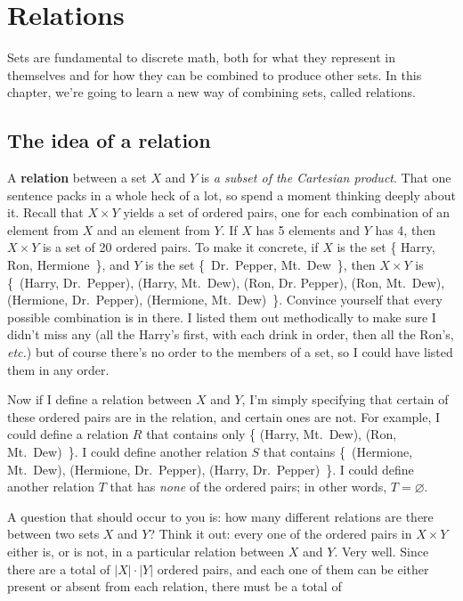
\chapter{Relations}
\label{chap:relations}

Sets are fundamental to discrete math, both for what they represent in
themselves and for how they can be combined to produce other sets. In this
chapter, we're going to learn a new way of combining sets, called
relations.

\section{The idea of a relation}

A \textbf{relation} between a set $X$ and $Y$ is \textit{a subset of the
Cartesian product}. That one sentence packs in a whole heck of a lot, so
spend a moment thinking deeply about it. Recall that $X \times Y$ yields a
set of ordered pairs, one for each combination of an element from $X$ and
an element from $Y$. If $X$ has 5 elements and $Y$ has 4, then $X \times Y$
is a set of 20 ordered pairs. To make it concrete, if $X$ is the set \{
Harry, Ron, Hermione~\}, and $Y$ is the set \{~Dr.~Pepper, Mt.~Dew~\}, then
$X \times Y$ is \{~(Harry, Dr.~Pepper), (Harry, Mt.~Dew), (Ron, Dr.
Pepper), (Ron, Mt.~Dew), (Hermione, Dr.~Pepper), (Hermione, Mt.~Dew)~\}.
Convince yourself that every possible combination is in there. I listed
them out methodically to make sure I didn't miss any (all the Harry's
first, with each drink in order, then all the Ron's, \textit{etc.}) but of
course there's no order to the members of a set, so I could have listed
them in any order.

Now if I define a relation between $X$ and $Y$, I'm simply specifying that
certain of these ordered pairs are in the relation, and certain ones are
not. For example, I could define a relation $R$ that contains only \{
(Harry, Mt.~Dew), (Ron, Mt.~Dew)~\}. I could define another relation $S$
that contains \{~(Hermione, Mt.~Dew), (Hermione, Dr.~Pepper), (Harry,
Dr.~Pepper)~\}. I could define another relation $T$ that has \textit{none}
of the ordered pairs; in other words, $T = \varnothing$. 

A question that should occur to you is: how many different relations are
there between two sets $X$ and $Y$? Think it out: every one of the ordered
pairs in $X \times Y$ either is, or is not, in a particular relation
between $X$ and $Y$. Very well. Since there are a total of $|X|\cdot|Y|$
ordered pairs, and each one of them can be either present or absent from
each relation, there must be a total of

